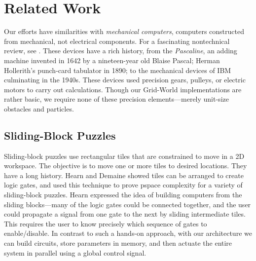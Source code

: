 \section{Related Work}\label{sec:RelatedWork}
Our efforts have similarities with \emph{mechanical computers},  computers
constructed from mechanical, not electrical components. For a fascinating
nontechnical review, see \cite{McCourtney1999}.  These devices have a rich
history, from the \emph{Pascaline}, an adding machine invented in 1642 by a
nineteen-year old Blaise Pascal; Herman Hollerith's punch-card tabulator in
1890; to the mechanical devices of IBM culminating in the 1940s.  These devices
used precision gears, pulleys, or electric motors to carry out calculations.
Though our {\sc Grid-World} implementations are rather basic, 
we require none of these precision elements---merely unit-size obstacles and particles.

\subsection{Sliding-Block Puzzles}
Sliding-block puzzles use rectangular tiles that are constrained to move in a 2D workspace. The objective is to move one or more tiles to desired locations. They have a long history.
Hearn \cite{hearn2005complexity} and Demaine \cite{Demaine2009} showed tiles can be arranged to create logic gates, and used this technique to prove {\sc pspace} complexity for a variety of sliding-block puzzles.  Hearn expressed the idea of building computers from the sliding blocks---many of the logic gates could be connected together, and the user could propagate a signal from one gate to the next by sliding intermediate tiles.  This requires the user to know precisely which sequence of gates to enable/disable.  In contrast to such a hands-on approach, with our architecture we can build circuits, store parameters in memory, and then actuate the entire system in parallel using a global control signal.


